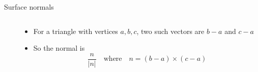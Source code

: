 \begin{frame}{Surface normals}
\begin{columns}
\begin{column}{0.33\textwidth}
		\end{column}
		\begin{column}{0.65\textwidth}
			\begin{itemize}
				\item For a triangle with vertices $a, b, c$, two such vectors are $b-a$ and $c-a$
				\pause\item So the normal is
					$$ \frac{n}{|n|} \quad \text{where} \quad n = (b-a) \times (c-a) $$
			\end{itemize}
		\end{column}
	\end{columns}
\end{frame}
